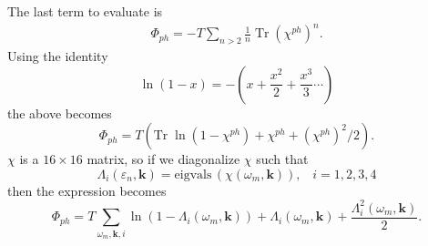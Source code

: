 The last term to evaluate is
\begin{eqnarray}
\Phi_{ph} = -T \sum_{n > 2} \frac{1}{n}
\; \mathrm{Tr} \; (\chi^{ph})^n.
\end{eqnarray}
Using the identity
\begin{equation}
\ln (1 - x) = -(x + \frac{x^2}{2} + \frac{x^3}{3} \cdots)
\end{equation}
the above becomes
\begin{equation}
\Phi_{ph} = T \left(\mathrm{Tr} \; \ln(1 - \chi^{ph}) + \chi^{ph} + 
(\chi^{ph})^2 /2\right).
\end{equation}  
$\chi$ is a $16 \times 16$ matrix, 
so if we diagonalize $\chi$
such that
\begin{equation}
\Lambda_i(\varepsilon_n, \mathbf{k}) = 
\mathrm{eigvals}\,( \chi(\omega_m, \mathbf{k})),\;\;\;i = 1,2,3,4
\end{equation}
then the expression becomes
\begin{equation}
\Phi_{ph} = 
 T \sum_{\omega_m,\mathbf{k},i} \ln(1 - \Lambda_i(\omega_m,\mathbf{k}))
 +  \Lambda_i(\omega_m,\mathbf{k}) + 
\frac{\Lambda_i^2(\omega_m,\mathbf{k})}{2}.
\end{equation}
